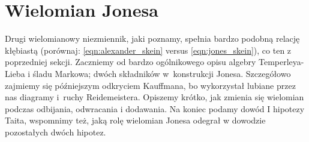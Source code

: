 
\section{Wielomian Jonesa}
%
Drugi wielomianowy niezmiennik, jaki poznamy, spełnia bardzo podobną relację kłębiastą (porównaj: \ref{eqn:alexander_skein} versus \ref{eqn:jones_skein}), co ten z poprzedniej sekcji.
Zaczniemy od bardzo ogólnikowego opisu algebry Temperleya-Lieba i śladu Markowa; dwóch składników w~konstrukcji Jonesa.
Szczegółowo zajmiemy się późniejszym odkryciem Kauffmana, bo wykorzystał lubiane przez nas diagramy i~ruchy Reidemeistera.
Opiszemy krótko, jak zmienia się wielomian podczas odbijania, odwracania i dodawania.
Na koniec podamy dowód I hipotezy Taita, wspomnimy też, jaką rolę wielomian Jonesa odegrał w dowodzie pozostałych dwóch hipotez.













%



